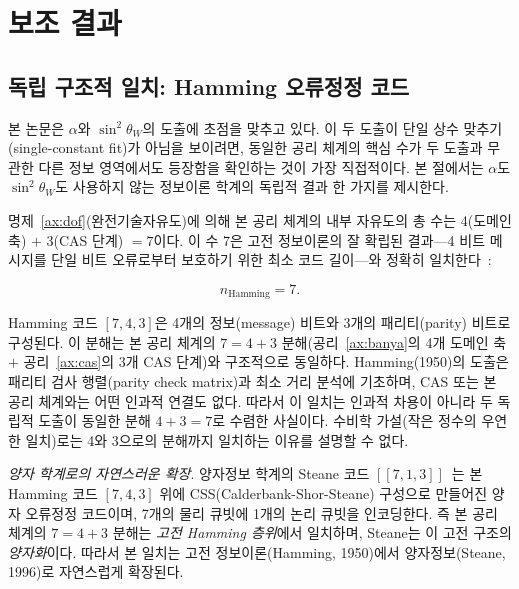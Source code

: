 \documentclass[entropy,article,submit,pdftex,oneauthor]{Definitions/mdpi}
\begin{document}

\section{보조 결과}
\label{sec:auxiliary}

\subsection{독립 구조적 일치: Hamming 오류정정 코드}
\label{sec:predictions}

본 논문은 $\alpha$와 $\sin^2\theta_W$의 도출에 초점을 맞추고 있다. 이 두 도출이 단일 상수 맞추기(single-constant fit)가 아님을 보이려면, 동일한 공리 체계의 핵심 수가 두 도출과 무관한 다른 정보 영역에서도 등장함을 확인하는 것이 가장 직접적이다. 본 절에서는 $\alpha$도 $\sin^2\theta_W$도 사용하지 않는 정보이론 학계의 독립적 결과 한 가지를 제시한다.

명제~\ref{ax:dof}(완전기술자유도)에 의해 본 공리 체계의 내부 자유도의 총 수는 4(도메인 축) $+$ 3(CAS 단계) $= 7$이다. 이 수 7은 고전 정보이론의 잘 확립된 결과---4 비트 메시지를 단일 비트 오류로부터 보호하기 위한 최소 코드 길이---와 정확히 일치한다~\cite{hamming1950}:
\begin{linenomath}
\begin{equation}
n_{\mathrm{Hamming}} = 7.
\end{equation}
\end{linenomath}
Hamming 코드 $[7, 4, 3]$은 4개의 정보(message) 비트와 3개의 패리티(parity) 비트로 구성된다. 이 분해는 본 공리 체계의 $7 = 4 + 3$ 분해(공리~\ref{ax:banya}의 4개 도메인 축 $+$ 공리~\ref{ax:cas}의 3개 CAS 단계)와 구조적으로 동일하다. Hamming(1950)의 도출은 패리티 검사 행렬(parity check matrix)과 최소 거리 분석에 기초하며, CAS 또는 본 공리 체계와는 어떤 인과적 연결도 없다. 따라서 이 일치는 인과적 차용이 아니라 두 독립적 도출이 동일한 분해 $4+3=7$로 수렴한 사실이다. 수비학 가설(작은 정수의 우연한 일치)로는 4와 3으로의 분해까지 일치하는 이유를 설명할 수 없다.

\emph{양자 학계로의 자연스러운 확장}. 양자정보 학계의 Steane 코드 $[[7,1,3]]$~\cite{steane1996}는 본 Hamming 코드 $[7,4,3]$ 위에 CSS(Calderbank-Shor-Steane) 구성으로 만들어진 양자 오류정정 코드이며, 7개의 물리 큐빗에 1개의 논리 큐빗을 인코딩한다. 즉 본 공리 체계의 $7 = 4+3$ 분해는 \emph{고전 Hamming 층위}에서 일치하며, Steane는 이 고전 구조의 \emph{양자화}이다. 따라서 본 일치는 고전 정보이론(Hamming, 1950)에서 양자정보(Steane, 1996)로 자연스럽게 확장된다.
\end{document}
